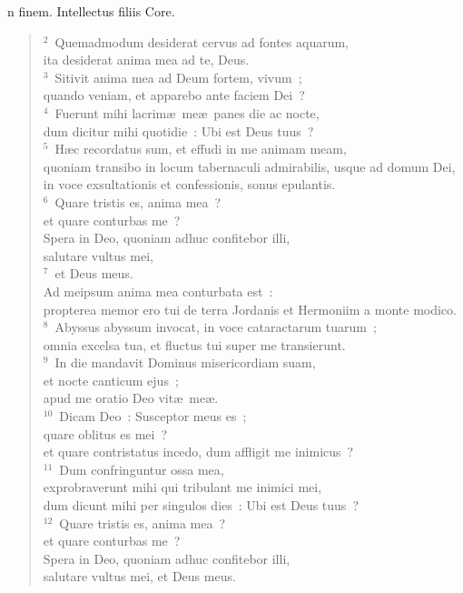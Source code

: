 \bchapter
{}n finem. Intellectus filiis Core.
\begin{flushleft}\begin{verse}\vspace{6pt}${}^{2}$~Quemadmodum desiderat cervus ad fontes aquarum,\\ ita desiderat anima mea ad te, Deus.\\
${}^{3}$~Sitivit anima mea ad Deum fortem, vivum~;\\ quando veniam, et apparebo ante faciem Dei~?\\
${}^{4}$~Fuerunt mihi lacrim\ae\ me\ae\ panes die ac nocte,\\ dum dicitur mihi quotidie~: Ubi est Deus tuus~?\\
${}^{5}$~H\ae c recordatus sum, et effudi in me animam meam,\\ quoniam transibo in locum tabernaculi admirabilis, usque ad domum Dei,\\ in voce exsultationis et confessionis, sonus epulantis.\\
${}^{6}$~Quare tristis es, anima mea~?\\ et quare conturbas me~?\\ Spera in Deo, quoniam adhuc confitebor illi,\\ salutare vultus mei,\\
${}^{7}$~et Deus meus.\\ Ad meipsum anima mea conturbata est~:\\ propterea memor ero tui de terra Jordanis et Hermoniim a monte modico.\\
${}^{8}$~Abyssus abyssum invocat, in voce cataractarum tuarum~;\\ omnia excelsa tua, et fluctus tui super me transierunt.\\
${}^{9}$~In die mandavit Dominus misericordiam suam,\\ et nocte canticum ejus~;\\ apud me oratio Deo vit\ae\ me\ae .\\
${}^{10}$~Dicam Deo~: Susceptor meus es~;\\ quare oblitus es mei~?\\ et quare contristatus incedo, dum affligit me inimicus~?\\
${}^{11}$~Dum confringuntur ossa mea,\\ exprobraverunt mihi qui tribulant me inimici mei,\\ dum dicunt mihi per singulos dies~: Ubi est Deus tuus~?\\
${}^{12}$~Quare tristis es, anima mea~?\\ et quare conturbas me~?\\ Spera in Deo, quoniam adhuc confitebor illi,\\ salutare vultus mei, et Deus meus.\end{verse}\end{flushleft}



